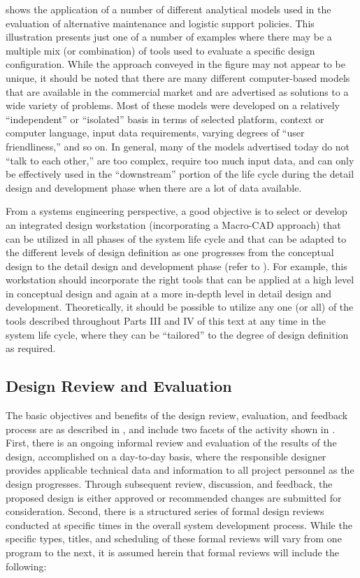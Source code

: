 shows the application of a number of different analytical models used in the evaluation of alternative maintenance and logistic support policies. This illustration presents just one of a number of examples where there may be a multiple mix (or combination) of tools used to evaluate a specific design configuration. While the approach conveyed in the figure may not appear to be unique, it should be noted that there are many different computer-based models that are available in the commercial market and are advertised as solutions to a wide variety of problems. Most of these models were developed on a relatively ``independent'' or ``isolated'' basis in terms of selected platform, context or computer language, input data requirements, varying degrees of ``user friendliness,'' and so on. In general, many of the models advertised today do not ``talk to each other,'' are too complex, require too much input data, and can only be effectively used in the ``downstream'' portion of the life cycle during the detail design and development phase when there are a lot of data available.

From a systems engineering perspective, a good objective is to select or develop an integrated design workstation (incorporating a Macro-CAD approach) that can be utilized in all phases of the system life cycle and that can be adapted to the different levels of design definition as one progresses from the conceptual design to the detail design and development phase (refer to ). For example, this workstation should incorporate the right tools that can be applied at a high level in conceptual design and again at a more in-depth level in detail design and development. Theoretically, it should be possible to utilize any one (or all) of the tools described throughout Parts III and IV of this text at any time in the system life cycle, where they can be ``tailored'' to the degree of design definition as required.

\subsection{Design Review and Evaluation}

The basic objectives and benefits of the design review, evaluation, and feedback process are as described in , and include two facets of the activity shown in . First, there is an ongoing informal review and evaluation of the results of the design, accomplished on a day-to-day basis, where the responsible designer provides applicable technical data and information to all project personnel as the design progresses. Through subsequent review, discussion, and feedback, the proposed design is either approved or recommended changes are submitted for consideration. Second, there is a structured series of formal design reviews conducted at specific times in the overall system development process. While the specific types, titles, and scheduling of these formal reviews will vary from one program to the next, it is assumed herein that formal reviews will include the following:

